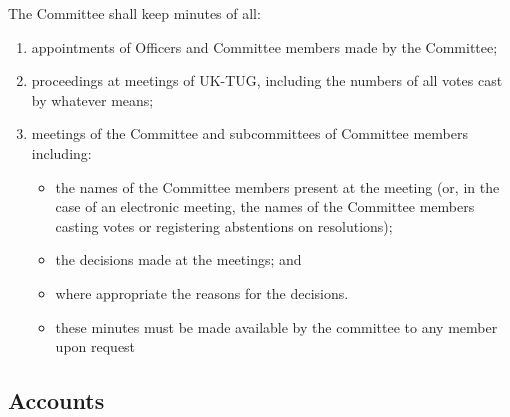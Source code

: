 \documentclass[a4paper,11pt]{article}
\begin{document}
The Committee shall keep minutes of all:
\begin{enumerate}
\item appointments of Officers and Committee members made by the Committee;
\item proceedings at meetings of UK-TUG, including the numbers of all votes cast by 
  whatever means;
\item meetings of the Committee and subcommittees of Committee members
  including:
\begin{itemize}
\item the names of the Committee members present at the meeting (or, in the case of an electronic meeting, the names of the Committee members casting votes or registering abstentions on resolutions);
\item the decisions made at the meetings; and
\item where appropriate the reasons for the decisions.
\item these minutes must be made available by the committee to any member upon
  request
\end{itemize}
\end{enumerate}


\subsection{Accounts}
\label{accounts}
\end{document}
